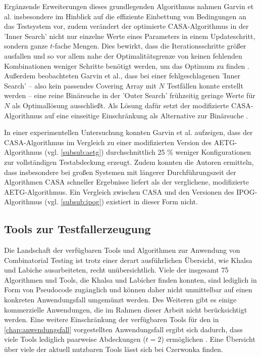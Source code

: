 Ergänzende Erweiterungen dieses grundlegenden Algorithmus nahmen Garvin et al. \cite{garvin2011evaluating} insbesondere im Hinblick auf die effiziente Einbettung von Bedingungen an das Testsystem vor, zudem verändert der optimierte CASA-Algorithmus in der 'Inner Search' nicht nur einzelne Werte eines Parameters in einem Updateschritt, sondern ganze $t$-fache Mengen. Dies bewirkt, dass die Iterationsschritte größer ausfallen und so vor allem nahe der Optimalitätsgrenze von keinen fehlenden Kombinationen weniger Schritte benötigt werden, um das Optimum zu finden \cite{garvin2011evaluating}. Außerdem beobachteten Garvin et al., dass bei einer fehlgeschlagenen 'Inner Search' -- also kein passendes Covering Array mit $N$ Testfällen konnte erstellt werden -- eine reine Binärsuche in der 'Outer Search' frühzeitig geringe Werte für $N$ als Optimallösung ausschließt. Als Lösung dafür setzt der modifizierte CASA-Algorithmus auf eine einseitige Einschränkung als Alternative zur Binärsuche \cite{garvin2011evaluating}.

In einer experimentellen Untersuchung konnten Garvin et al. \cite{garvin2011evaluating} aufzeigen, dass der CASA-Algorithmus im Vergleich zu einer modifizierten Version des AETG-Algorithmus (vgl. \autoref{subsub:aetg}) durchschnittlich 25 \% weniger Konfigurationen zur vollständigen Testabdeckung erzeugt. Zudem konnten die Autoren ermitteln, dass insbesondere bei großen Systemen mit längerer Durchführungszeit der Algorithmen CASA schneller Ergebnisse liefert als der verglichene, modifizierte AETG-Algorithmus. Ein Vergleich zwischen CASA und den Versionen des IPOG-Algorithmus (vgl. \autoref{subsub:ipog}) existiert in dieser Form nicht.

\subsection{Tools zur Testfallerzeugung}

Die Landschaft der verfügbaren Tools und Algorithmen zur Anwendung von Combinatorial Testing ist trotz einer derart ausführlichen Übersicht, wie Khalsa und Labiche \cite{khalsa2014orchestrated} ausarbeiteten, recht unübersichtlich. Viele der insgesamt 75 Algorithmen und Tools, die Khalsa und Labicher finden konnten, sind lediglich in Form von Pseudocode zugänglich und können daher nicht unmittelbar auf einen konkreten Anwendungsfall umgemünzt werden. Des Weiteren gibt es einige kommerzielle Anwendungen, die im Rahmen dieser Arbeit nicht berücksichtigt werden. Eine weitere Einschränkung der verfügbaren Tools für den in \autoref{chap:anwendungsfall} vorgestellten Anwendungsfall ergibt sich dadurch, dass viele Tools lediglich paarweise Abdeckungen ($t=2$) ermöglichen \cite{khalsa2014orchestrated}. Eine Übersicht über viele der aktuell nutzbaren Tools lässt sich bei Czerwonka \cite{pairwisetesting} finden.

